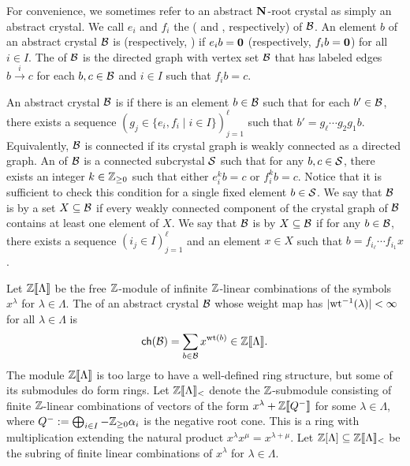 \documentclass[11pt]{article}
\begin{document}
For convenience, we sometimes refer to an abstract $\mathbf{N}$-root crystal as simply an abstract crystal.
We call $e_i$ and $f_i$ the ( and , respectively)  of $\mathcal{B}$.
An element $b$ of an abstract crystal $\mathcal{B}$ is  (respectively, ) if $e_ib=\boldsymbol{0}$ (respectively, $f_ib=\boldsymbol{0}$) for all $i \in I$.
The  of $\mathcal{B}$ is the directed graph with vertex set $\mathcal{B}$ that has labeled edges $b \xrightarrow{i} c$ for each $b,c \in \mathcal{B}$ and $i \in I$ such that $f_i b = c$.

An abstract crystal $\mathcal{B}$ is  if there is an element $b \in \mathcal{B}$ such that for  each $b' \in \mathcal{B}$, there exists a sequence $(g_j \in \{e_i, f_i \mid i \in I\})_{j=1}^{\ell}$ such that $b' = g_{\ell} \cdots g_2g_1 b$.
Equivalently, $\mathcal{B}$ is connected if its crystal graph is weakly connected as a directed graph.
An  of $\mathcal{B}$ is a connected subcrystal $\mathcal{S}$ such that for any $b, c \in \mathcal{S}$,
there exists an integer $k\in\mathbb{Z}_{\geq 0}$ such that either $e_i^k b = c$ or $f_i^k b = c$. 
Notice that it is sufficient to check this  condition for a single fixed element $b \in \mathcal{S}$.
%
We say that $\mathcal{B}$ is  by a set $X \subseteq \mathcal{B}$
if every weakly connected component of the crystal graph of $\mathcal{B}$ contains at least one element of $X$.
We say that $\mathcal{B}$ is  by $X \subseteq \mathcal{B}$ if for any $b \in \mathcal{B}$, there exists a sequence $(i_j \in I)_{j=1}^{\ell}$ and an element $x \in X$ such that $b = f_{i_{\ell}} \cdots f_{i_1} x$. 

Let $\mathbb{Z}\llbracket\Lambda\rrbracket$ be the free $\mathbb{Z}$-module of infinite $\mathbb{Z}$-linear combinations of the symbols $ x^{\lambda} $ for $ \lambda \in \Lambda $.
The  of an abstract crystal $\mathcal{B}$ whose weight map has $\lvert \operatorname{wt}^{-1}(\lambda) \rvert < \infty$ for all $\lambda \in \Lambda$ is 
\[
\mathsf{ch}(\mathcal{B}) = \sum_{b \in \mathcal{B}} x^{\operatorname{wt}(b)} \in \mathbb{Z}\llbracket\Lambda\rrbracket.
\]
The module $\mathbb{Z}\llbracket\Lambda\rrbracket$ 
is too large to have a well-defined ring structure,
but some of its submodules do form rings.
Let $\mathbb{Z}\llbracket\Lambda\rrbracket_<$ denote the $\mathbb{Z}$-submodule consisting of finite $\mathbb{Z}$-linear combinations of vectors of the form $x^{\lambda} + \mathbb{Z}\llbracket Q^- \rrbracket$ for some $\lambda \in \Lambda$, where
$
Q^- := \bigoplus_{i \in I} -\mathbb{Z}_{\geq 0} \alpha_i
$
is the negative root cone.
This is a ring with multiplication extending the natural product $x^{\lambda} x^{\mu} = x^{\lambda + \mu}$.
Let $\mathbb{Z}[\Lambda] \subseteq \mathbb{Z}\llbracket\Lambda\rrbracket_<$ be the subring of finite linear combinations of $x^{\lambda}$ for $\lambda \in \Lambda$.
\end{document}
